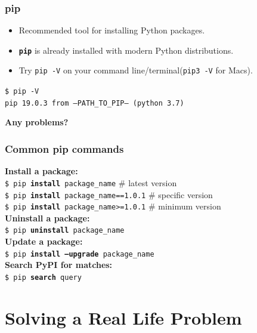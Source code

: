     \begin{frame}
        \frametitle{pip}
        \LARGE
        \pause
        \begin{itemize}
        \item Recommended tool for installing Python packages.
        \pause
        \item \textbf{\texttt{pip}} is already installed with modern Python distributions.
        \pause
        \item Try \texttt{pip -V} on your command line/terminal(\texttt{pip3 -V} for Macs). 
        \end{itemize}
        \pause
        \texttt{\$ pip -V}\\
        \texttt{pip 19.0.3 from --PATH\_TO\_PIP-- (python 3.7)}\\
        \pause
        \begin{center}
            \huge
            \textbf{Any problems?}            
        \end{center}
        
    \end{frame}

    \begin{frame}
        \frametitle{Common pip commands}
        \LARGE
        \pause
        \textbf{Install a package:}\\
        \pause
        \texttt{\$ pip \textbf{install} package\_name}  \# latest version \\
        \pause
        \texttt{\$ pip \textbf{install} package\_name==1.0.1}  \# specific version \\
        \pause
        \texttt{\$ pip \textbf{install} package\_name>=1.0.1}  \# minimum version \\
        \pause        
        \textbf{Uninstall a package:}\\
        \pause        
        \texttt{\$ pip \textbf{uninstall} package\_name}\\
        \pause
        \textbf{Update a package:}\\
        \pause
        \texttt{\$ pip \textbf{install --upgrade} package\_name}\\
        \pause
        \textbf{Search PyPI for matches:}\\
        \pause
        \texttt{\$ pip \textbf{search} query}
    \end{frame}

    \section{Solving a Real Life Problem}

